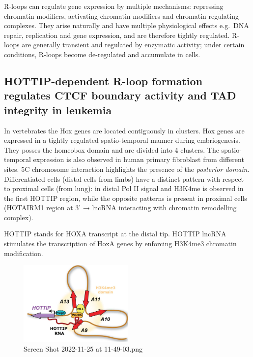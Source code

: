 R-loops can regulate gene expression by multiple mechanisms: repressing chromatin modifiers, activating chromatin modifiers and chromatin regulating complexes. They arise naturally and have multiple physiological effects e.g.~DNA repair, replication and gene expression, and are therefore tightly regulated. R-loops are generally transient and regulated by enzymatic activity; under certain conditions, R-loops become de-regulated and accumulate in cells.

\hypertarget{hottip-dependent-r-loop-formation-regulates-ctcf-boundary-activity-and-tad-integrity-in-leukemia}{%
\subsection{HOTTIP-dependent R-loop formation regulates CTCF boundary activity and TAD integrity in leukemia}\label{hottip-dependent-r-loop-formation-regulates-ctcf-boundary-activity-and-tad-integrity-in-leukemia}}

In vertebrates the Hox genes are located contiguously in clusters. Hox genes are expressed in a tightly regulated spatio-temporal manner during embriogenesis. They posses the homeobox domain and are divided into 4 clusters. The spatio-temporal expression is also observed in human primary fibroblast from different sites. 5C chromosome interaction highlights the presence of the \emph{posterior domain}. Differentiated cells (distal cells from limbs) have a distinct pattern with respect to proximal cells (from lung): in distal Pol II signal and H3K4me is observed in the first HOTTIP region, while the opposite patterns is present in proximal cells (HOTAIRM1 region at 3' → lncRNA interacting with chromatin remodelling complex).

HOTTIP stands for HOXA transcript at the distal tip. HOTTIP lncRNA stimulates the transcription of HoxA genes by enforcing H3K4me3 chromatin modification.

\begin{figure}
\centering
\includegraphics[width=0.5\textwidth]{../_resources/Screen_Shot_2022-11-25_at_11-49-03.png}
\caption{Screen Shot 2022-11-25 at 11-49-03.png}
\end{figure}

